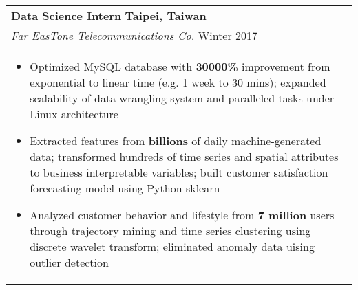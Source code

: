 \documentclass[a4paper,11pt]{article} %
\begin{document}
{\begin{tabular}{p{18.5cm}}
{\bf{Data Science Intern}} \hfill \bf{Taipei, Taiwan}\\
{\it Far EasTone Telecommunications Co.} \hfill  Winter 2017\\%
\begin{itemize}
\vspace{-3mm}
\item Optimized MySQL database with {\bf30000\%} improvement from exponential to linear time (e.g. 1 week to 30 mins); expanded scalability of data wrangling system and paralleled tasks under Linux architecture
\item Extracted features from {\bf billions} of daily machine-generated data; transformed hundreds of time series and spatial attributes to business interpretable variables; built customer satisfaction forecasting model using Python sklearn
\item Analyzed customer behavior and lifestyle from {\bf7 million} users through trajectory mining and time series clustering using discrete wavelet transform; eliminated anomaly data uising outlier detection\vspace*{-\baselineskip}
\end{itemize} 
\vspace{.1mm}

%


\end{tabular}}
\end{document}
